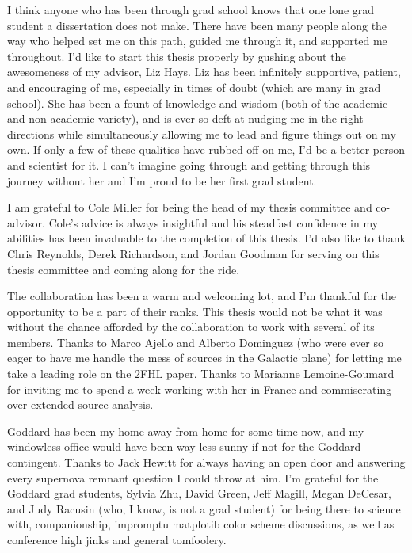 I think anyone who has been through grad school knows that one lone grad student a dissertation does not make. There have been many people along the way who helped set me on this path, guided me through it, and  supported me throughout. I'd like to start this thesis properly by gushing about the awesomeness of my advisor, Liz Hays. Liz has been infinitely supportive, patient, and encouraging of me, especially in times of doubt (which are many in grad school). She has been a fount of knowledge and wisdom (both of the academic and non-academic variety), and is ever so deft at nudging me in the right directions while simultaneously allowing me to lead and figure things out on my own. If only a few of these qualities have rubbed off on me, I'd be a better person and scientist for it. I can't imagine going through and getting through this journey without her and I'm proud to be her first grad student. 

I am grateful to Cole Miller for being the head of my thesis committee and co-advisor. Cole's advice is always insightful and his steadfast confidence in my abilities has been invaluable to the completion of this thesis. I'd also like to thank Chris Reynolds, Derek Richardson, and Jordan Goodman for serving on this thesis committee and coming along for the ride.

The \Fermi{} collaboration has been a warm and welcoming lot, and I'm thankful for the opportunity to be a part of their ranks. This thesis would not be what it was without the chance afforded by the collaboration to work with several of its members. Thanks to Marco Ajello and  Alberto Dominguez (who were ever so eager to have me handle the mess of sources in the Galactic plane) for letting me take a leading role on the 2FHL paper. Thanks to Marianne Lemoine-Goumard for inviting me to spend a week working with her in France and commiserating over extended source analysis. 

Goddard has been my home away from home for some time now, and my windowless office would have been way less sunny if not for the Goddard \Fermi{} contingent. Thanks to Jack Hewitt for always having an open door and answering every supernova remnant question I could throw at him. I'm grateful for the Goddard \Fermi{} grad students, Sylvia Zhu, David Green, Jeff Magill, Megan DeCesar, and Judy Racusin (who, I know, is not a grad student) for being there to science with, companionship, impromptu matplotib color scheme discussions, as well as conference high jinks and general tomfoolery. 

